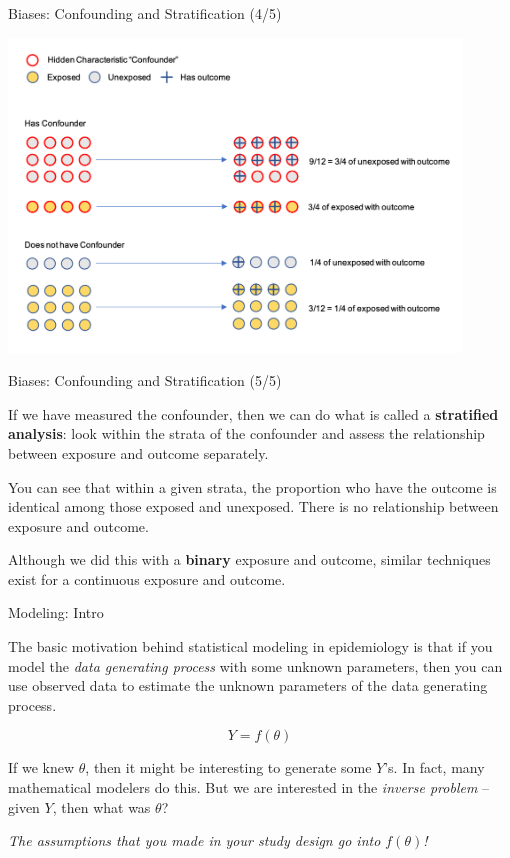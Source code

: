 \documentclass[ignorenonframetext,]{beamer}
\begin{document}
\begin{frame}{Biases: Confounding and Stratification (4/5)}
\protect\hypertarget{biases-confounding-and-stratification-45}{}

\includegraphics[width=0.9\textwidth,height=\textheight]{../media/confounder-3.png}

\end{frame}

\begin{frame}{Biases: Confounding and Stratification (5/5)}
\protect\hypertarget{biases-confounding-and-stratification-55}{}

If we have measured the confounder, then we can do what is called a
\textbf{stratified analysis}: look within the strata of the confounder
and assess the relationship between exposure and outcome separately.

You can see that within a given strata, the proportion who have the
outcome is identical among those exposed and unexposed. There is no
relationship between exposure and outcome.

Although we did this with a \textbf{binary} exposure and outcome,
similar techniques exist for a continuous exposure and outcome.

\end{frame}

\begin{frame}{Modeling: Intro}
\protect\hypertarget{modeling-intro}{}

The basic motivation behind statistical modeling in epidemiology is that
if you model the \emph{data generating process} with some unknown
parameters, then you can use observed data to estimate the unknown
parameters of the data generating process.

\[
Y = f(\theta)
\]

If we knew \(\theta\), then it might be interesting to generate some
\(Y\)'s. In fact, many mathematical modelers do this. But we are
interested in the \emph{inverse problem} -- given \(Y\), then what was
\(\theta\)?

\emph{The assumptions that you made in your study design go into
\(f(\theta)\)!}

\end{frame}
\end{document}
